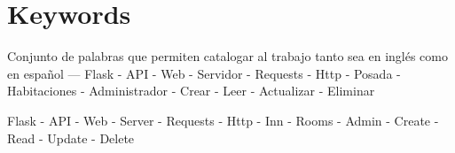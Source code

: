\section{Keywords}

Conjunto de palabras que permiten catalogar al trabajo tanto sea en inglés como en español
—
Flask - API - Web - Servidor - Requests - Http - Posada - Habitaciones - Administrador - Crear - Leer - Actualizar - Eliminar

Flask - API - Web - Server - Requests - Http - Inn - Rooms - Admin - Create - Read - Update - Delete
